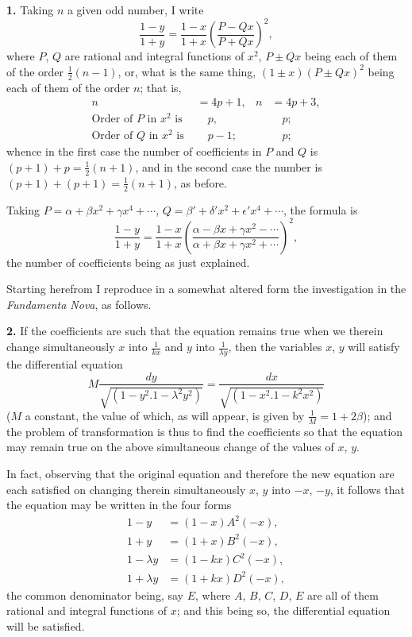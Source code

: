 \documentclass[11pt,a4paper]{article}
\theoremstyle{plain}
\begin{document}
\medskip
\noindent\textbf{1.} Taking $n$ a given odd number, I write
\[
\frac{1 - y}{1 + y} = \frac{1 - x}{1 + x}\left(\frac{P - Qx}{P + Qx}\right)^2,
\]
where $P$, $Q$ are rational and integral functions of $x^2$, $P \pm Qx$ being each of them of the order $\frac{1}{2}(n - 1)$, or, what is the same thing, $(1 \pm x)(P \pm Qx)^2$ being each of them of the order $n$; that is,
\begin{align*}
n &= 4p + 1, & n &= 4p + 3, \\
\text{Order of } P \text{ in } x^2 \text{ is } &\quad p, & &\quad p; \\
\text{Order of } Q \text{ in } x^2 \text{ is } &\quad p - 1; & &\quad p;
\end{align*}
whence in the first case the number of coefficients in $P$ and $Q$ is $(p + 1) + p = \frac{1}{2}(n + 1)$, and in the second case the number is $(p + 1) + (p + 1) = \frac{1}{2}(n + 1)$, as before.

Taking $P = \alpha + \beta x^2 + \gamma x^4 + \cdots$, $Q = \beta' + \delta' x^2 + \epsilon' x^4 + \cdots$, the formula is
\[
\frac{1 - y}{1 + y} = \frac{1 - x}{1 + x}\left(\frac{\alpha - \beta x + \gamma x^2 - \cdots}{\alpha + \beta x + \gamma x^2 + \cdots}\right)^2,
\]
the number of coefficients being as just explained.

Starting herefrom I reproduce in a somewhat altered form the investigation in the \textit{Fundamenta Nova}, as follows.

\medskip
\noindent\textbf{2.} If the coefficients are such that the equation remains true when we therein change simultaneously $x$ into $\frac{1}{kx}$ and $y$ into $\frac{1}{\lambda y}$, then the variables $x$, $y$ will satisfy the differential equation
\[
M\frac{dy}{\sqrt{(1 - y^2 . 1 - \lambda^2 y^2)}} = \frac{dx}{\sqrt{(1 - x^2 . 1 - k^2 x^2)}}
\]
($M$ a constant, the value of which, as will appear, is given by $\frac{1}{M} = 1 + 2\beta$); and the problem of transformation is thus to find the coefficients so that the equation may remain true on the above simultaneous change of the values of $x$, $y$.

In fact, observing that the original equation and therefore the new equation are each satisfied on changing therein simultaneously $x$, $y$ into $-x$, $-y$, it follows that the equation may be written in the four forms
\begin{align*}
1 - y &= (1 - x)A^2(-x), \\
1 + y &= (1 + x)B^2(-x), \\
1 - \lambda y &= (1 - kx)C^2(-x), \\
1 + \lambda y &= (1 + kx)D^2(-x),
\end{align*}
the common denominator being, say $E$, where $A$, $B$, $C$, $D$, $E$ are all of them rational and integral functions of $x$; and this being so, the differential equation will be satisfied.
\end{document}
